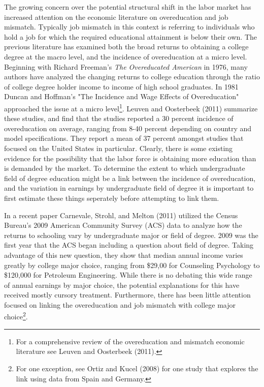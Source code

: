\documentclass[11pt]{article}
\theoremstyle{definition}
\begin{document}
\vspace{2mm}
The growing concern over the potential structural shift in the labor market has increased attention on the economic literature on overeducation and job mismatch.  Typically job mismatch in this context is referring to individuals who hold a job for which the required educational attainment is below their own.  The previous literature has examined both the broad returns to obtaining a college degree at the macro level, and the incidence of overeducation at a micro level.  Beginning with Richard Freeman's \textit{The Overeducated American} in 1976, many authors have analyzed the changing returns to college education through the ratio of college degree holder income to income of high school graduates.  In 1981 Duncan and Hoffman's "The Incidence and Wage Effects of Overeducation" approached the issue at a micro level\footnote{For a comprehensive review of the overeducation and mismatch economic literature see Leuven and Oosterbeek (2011).}.  Leuven and Oosterbeek (2011) summarize these studies, and find that the studies reported a 30 percent incidence of overeducation on average, ranging from 8-40 percent depending on country and model specifications.  They report a mean of 37 percent amongst studies that focused on the United States in particular.  Clearly, there is some existing evidence for the possibility that the labor force is obtaining more education than is demanded by the market.  To determine the extent to which undergraduate field of degree education might be a link between the incidence of overeducation, and the variation in earnings by undergraduate field of degree it is important to first estimate these things seperately before attempting to link them.  

\vspace{2mm}
In a recent paper Carnevale, Strohl, and Melton (2011) utilized the Census Bureau's 2009 American Community Survey (ACS) data to analyze how the returns to schooling vary by undergraduate major or field of degree.  2009 was the first year that the ACS began including a question about field of degree.  Taking advantage of this new question, they show that median annual income varies greatly by college major choice, ranging from \$29,00 for Counseling Psychology to \$120,000 for Petroleum Engineering.  While there is no debating this wide range of annual earnings by major choice, the potential explanations for this have received mostly cursory treatment.  Furthermore, there has been little attention focused on linking the overeducation and job mismatch with college major choice\footnote{For one exception, see Ortiz and Kucel (2008) for one study that explores the link using data from Spain and Germany.}.
\end{document}
